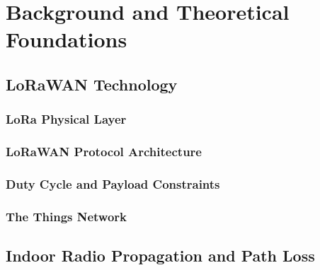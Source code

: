 \chapter{Background and Theoretical Foundations}
\label{ch:background}

\section{LoRaWAN Technology}
\label{sec:lorawan-tech}

\subsection{LoRa Physical Layer}

\subsection{LoRaWAN Protocol Architecture}

\subsection{Duty Cycle and Payload Constraints}

\subsection{The Things Network}

\section{Indoor Radio Propagation and Path Loss}
\label{sec:path-loss-theory}

